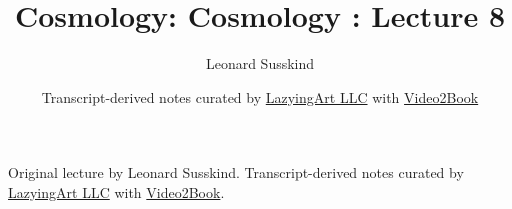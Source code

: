 \documentclass[11pt,oneside]{book}
\begin{document}
\frontmatter
\title{Cosmology: Cosmology : Lecture 8}
\author{Leonard Susskind}
\date{Transcript-derived notes curated by \href{https://lazying.art}{LazyingArt LLC} with \href{https://github.com/lachlanchen/Video2Book}{Video2Book}}
\maketitle
\begin{center}
\small Original lecture by Leonard Susskind. Transcript-derived notes curated by \href{https://lazying.art}{LazyingArt LLC} with \href{https://github.com/lachlanchen/Video2Book}{Video2Book}.
\end{center}
\clearpage
\mainmatter

\end{document}
